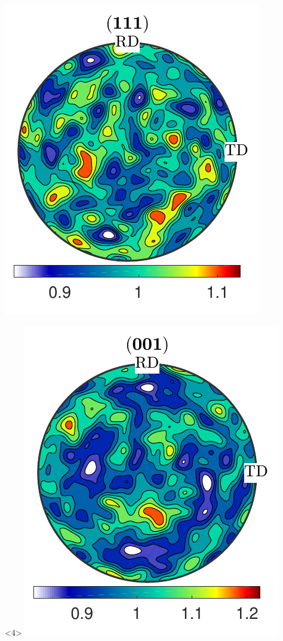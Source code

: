 \documentclass[compress]{beamer}
\begin{document}
\begin{frame}[fragile]
\begin{columns}
\begin{column}{0.29\textwidth}
\begin{onlyenv}
      \includegraphics[width=\textwidth]{pic/rolling111}
    \end{onlyenv}

      \begin{onlyenv}<4>
        \includegraphics[width=\textwidth]{pic/rolling001_1}


\end{onlyenv}
\end{column}
\end{columns}
\end{frame}
\end{document}
